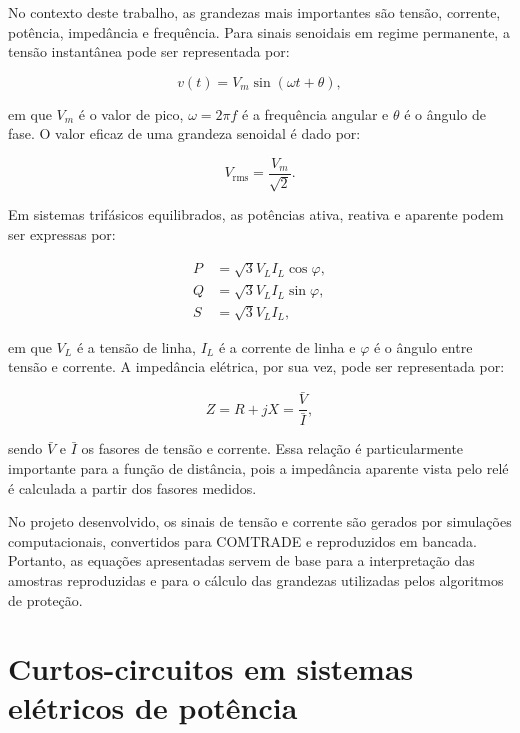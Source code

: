No contexto deste trabalho, as grandezas mais importantes são tensão, corrente, potência, impedância e frequência. Para sinais senoidais em regime permanente, a tensão instantânea pode ser representada por:

\begin{equation}
  v(t) = V_m \sin(\omega t + \theta),
  \label{eq:tensao-instantanea}
\end{equation}

\noindent em que $V_m$ é o valor de pico, $\omega = 2\pi f$ é a frequência angular e $\theta$ é o ângulo de fase. O valor eficaz de uma grandeza senoidal é dado por:

\begin{equation}
  V_{\text{rms}} = \frac{V_m}{\sqrt{2}}.
  \label{eq:vrms}
\end{equation}

Em sistemas trifásicos equilibrados, as potências ativa, reativa e aparente podem ser expressas por:

\begin{align}
  P &= \sqrt{3} V_L I_L \cos\varphi, \label{eq:potencia-ativa}\\
  Q &= \sqrt{3} V_L I_L \sin\varphi, \label{eq:potencia-reativa}\\
  S &= \sqrt{3} V_L I_L, \label{eq:potencia-aparente}
\end{align}

\noindent em que $V_L$ é a tensão de linha, $I_L$ é a corrente de linha e $\varphi$ é o ângulo entre tensão e corrente. A impedância elétrica, por sua vez, pode ser representada por:

\begin{equation}
  Z = R + jX = \frac{\bar{V}}{\bar{I}},
  \label{eq:impedancia}
\end{equation}

\noindent sendo $\bar{V}$ e $\bar{I}$ os fasores de tensão e corrente. Essa relação é particularmente importante para a função de distância, pois a impedância aparente vista pelo relé é calculada a partir dos fasores medidos.

No projeto desenvolvido, os sinais de tensão e corrente são gerados por simulações computacionais, convertidos para COMTRADE e reproduzidos em bancada. Portanto, as equações apresentadas servem de base para a interpretação das amostras reproduzidas e para o cálculo das grandezas utilizadas pelos algoritmos de proteção.

\section{Curtos-circuitos em sistemas elétricos de potência}

